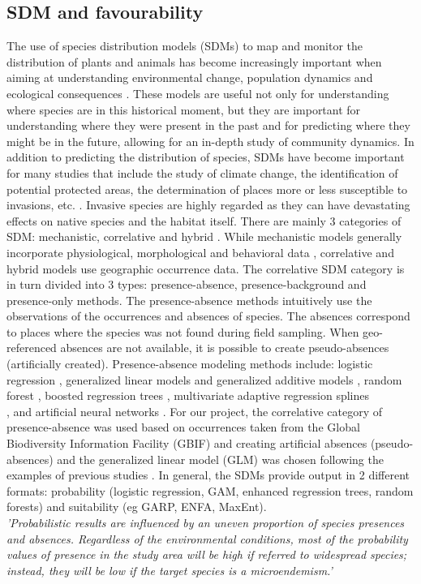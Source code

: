 \documentclass[12pt,a4paper]{article}
\begin{document}
\subsection{SDM and favourability}
The use of species distribution models (SDMs) to map and monitor the distribution of plants and animals has become increasingly important when aiming at understanding environmental change, population dynamics and ecological consequences \citep{mil}.
These models are useful not only for understanding where species are in this historical moment, but they are important for understanding where they were present in the past and for predicting where they might be in the future, allowing for an in-depth study of community dynamics.
In addition to predicting the distribution of species, SDMs have become important for many studies that include the study of climate change, the identification of potential protected areas, the determination of places more or less susceptible to invasions, etc. \citep{mil}.
Invasive species are highly regarded as they can have devastating effects on native species and the habitat itself.
There are mainly 3 categories of SDM: mechanistic, correlative and hybrid \citep{dor12}. While mechanistic models generally incorporate physiological, morphological and behavioral data \citep{kea}, correlative and hybrid models use geographic occurrence data.
The correlative SDM category is in turn divided into 3 types: presence-absence, presence-background and presence-only methods.
The presence-absence methods intuitively use the observations of the occurrences and absences of species. The absences correspond to places where the species was not found during field sampling. When geo-referenced absences are not available, it is possible to create pseudo-absences (artificially created).
Presence-absence modeling methods include: logistic regression \citep{bri}, generalized linear models and generalized additive models \citep{guis}, random forest \citep{brei}, boosted regression trees \citep{Eli}, multivariate adaptive regression splines \\ \citep{mois}, and artificial neural networks \citep{tarr}.
For our project, the correlative category of presence-absence was used based on occurrences taken from the Global Biodiversity Information Facility (GBIF) and creating artificial absences (pseudo-absences) and the generalized linear model (GLM) was chosen following the examples of previous studies \citep {eng} \citep {you}.
In general, the SDMs provide output in 2 different formats: probability (logistic regression, GAM, enhanced regression trees, random forests) and suitability (eg GARP, ENFA, MaxEnt). \\ \textit{'Probabilistic results are influenced by an uneven proportion of species presences and absences. Regardless of the environmental conditions, most of the probability values of presence in the study area will be high if referred to widespread species; instead, they will be low if the target species is a microendemism.'} \citep{fav}
\end{document}

